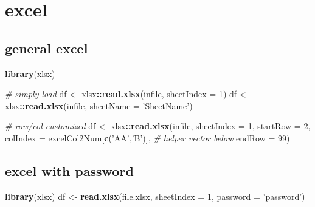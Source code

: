 \documentclass[
]{book}
\newenvironment{Shaded}{\begin{snugshade}}{\end{snugshade}}
\newcommand{\CommentTok}[1]{\textcolor[rgb]{0.56,0.35,0.01}{\textit{#1}}}
\newcommand{\DataTypeTok}[1]{\textcolor[rgb]{0.13,0.29,0.53}{#1}}
\newcommand{\DecValTok}[1]{\textcolor[rgb]{0.00,0.00,0.81}{#1}}
\newcommand{\KeywordTok}[1]{\textcolor[rgb]{0.13,0.29,0.53}{\textbf{#1}}}
\newcommand{\NormalTok}[1]{#1}
\newcommand{\OperatorTok}[1]{\textcolor[rgb]{0.81,0.36,0.00}{\textbf{#1}}}
\newcommand{\StringTok}[1]{\textcolor[rgb]{0.31,0.60,0.02}{#1}}
\begin{document}
\hypertarget{excel}{%
\section{excel}\label{excel}}

\hypertarget{general-excel}{%
\subsection{general excel}\label{general-excel}}

\begin{Shaded}
\begin{Highlighting}[]
\KeywordTok{library}\NormalTok{(xlsx)}

\CommentTok{# simply load}
\NormalTok{df <-}\StringTok{ }\NormalTok{xlsx}\OperatorTok{::}\KeywordTok{read.xlsx}\NormalTok{(infile, }\DataTypeTok{sheetIndex =} \DecValTok{1}\NormalTok{)}
\NormalTok{df <-}\StringTok{ }\NormalTok{xlsx}\OperatorTok{::}\KeywordTok{read.xlsx}\NormalTok{(infile, }\DataTypeTok{sheetName =} \StringTok{'SheetName'}\NormalTok{)}

\CommentTok{# row/col customized}
\NormalTok{df <-}\StringTok{ }\NormalTok{xlsx}\OperatorTok{::}\KeywordTok{read.xlsx}\NormalTok{(infile,}
                      \DataTypeTok{sheetIndex =} \DecValTok{1}\NormalTok{,}
                      \DataTypeTok{startRow =} \DecValTok{2}\NormalTok{,}
                      \DataTypeTok{colIndex =}\NormalTok{ excelCol2Num[}\KeywordTok{c}\NormalTok{(}\StringTok{'AA'}\NormalTok{,}\StringTok{'B'}\NormalTok{)], }\CommentTok{# helper vector below}
                      \DataTypeTok{endRow =} \DecValTok{99}\NormalTok{)}
\end{Highlighting}
\end{Shaded}

\hypertarget{excel-with-password}{%
\subsection{excel with password}\label{excel-with-password}}

\begin{Shaded}
\begin{Highlighting}[]
\KeywordTok{library}\NormalTok{(xlsx)}
\NormalTok{df <-}\StringTok{ }\KeywordTok{read.xlsx}\NormalTok{(file.xlsx,}
                \DataTypeTok{sheetIndex =} \DecValTok{1}\NormalTok{,}
                \DataTypeTok{password =} \StringTok{'password'}\NormalTok{)}
\end{Highlighting}
\end{Shaded}
\end{document}

